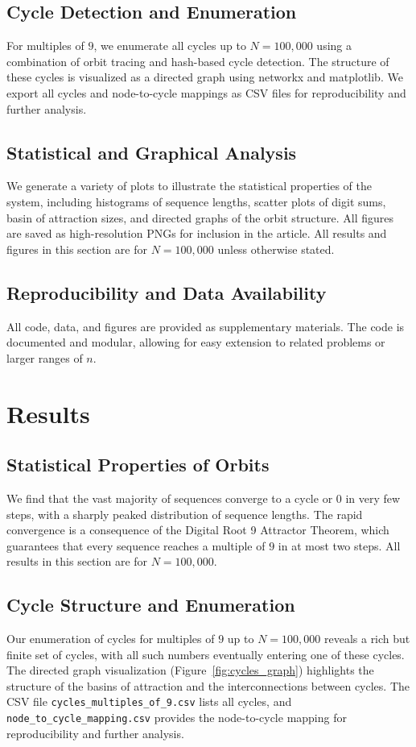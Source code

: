 \documentclass[12pt]{article}
\begin{document}
\subsection{Cycle Detection and Enumeration}
For multiples of $9$, we enumerate all cycles up to $N=100,000$ using a combination of orbit tracing and hash-based cycle detection. The structure of these cycles is visualized as a directed graph using networkx and matplotlib. We export all cycles and node-to-cycle mappings as CSV files for reproducibility and further analysis.

\subsection{Statistical and Graphical Analysis}
We generate a variety of plots to illustrate the statistical properties of the system, including histograms of sequence lengths, scatter plots of digit sums, basin of attraction sizes, and directed graphs of the orbit structure. All figures are saved as high-resolution PNGs for inclusion in the article. All results and figures in this section are for $N=100,000$ unless otherwise stated.

\subsection{Reproducibility and Data Availability}
All code, data, and figures are provided as supplementary materials. The code is documented and modular, allowing for easy extension to related problems or larger ranges of $n$.

\section{Results}
\subsection{Statistical Properties of Orbits}
We find that the vast majority of sequences converge to a cycle or $0$ in very few steps, with a sharply peaked distribution of sequence lengths. The rapid convergence is a consequence of the Digital Root 9 Attractor Theorem, which guarantees that every sequence reaches a multiple of $9$ in at most two steps. All results in this section are for $N=100,000$.

\subsection{Cycle Structure and Enumeration}
Our enumeration of cycles for multiples of $9$ up to $N=100,000$ reveals a rich but finite set of cycles, with all such numbers eventually entering one of these cycles. The directed graph visualization (Figure~\ref{fig:cycles_graph}) highlights the structure of the basins of attraction and the interconnections between cycles. The CSV file \texttt{cycles\_multiples\_of\_9.csv} lists all cycles, and \texttt{node\_to\_cycle\_mapping.csv} provides the node-to-cycle mapping for reproducibility and further analysis.
\end{document}
